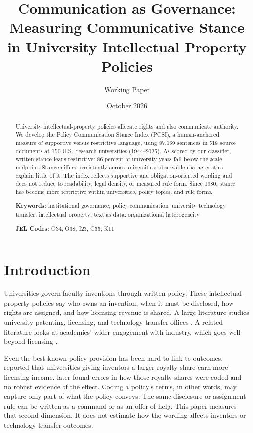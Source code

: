 \documentclass[11pt]{article}
\title{\textbf{Communication as Governance:}\\[2pt]
\textbf{Measuring Communicative Stance in University Intellectual Property Policies}}
\author{Working Paper}
\date{October 2026}
\begin{document}
\maketitle
\thispagestyle{empty}

\begin{abstract}
\noindent University intellectual-property policies allocate rights and also communicate authority. We develop the Policy Communication Stance Index (PCSI), a human-anchored measure of supportive versus restrictive language, using 87,159 sentences in 518 source documents at 150 U.S.\ research universities (1944--2025). As scored by our classifier, written stance leans restrictive: 86 percent of university-years fall below the scale midpoint. Stance differs persistently across universities; observable characteristics explain little of it. The index reflects supportive and obligation-oriented wording and does not reduce to readability, legal density, or measured rule form. Since 1980, stance has become more restrictive within universities, policy topics, and rule forms.

\vspace{0.8em}
\noindent\textbf{Keywords:} institutional governance; policy communication; university technology transfer; intellectual property; text as data; organizational heterogeneity

\noindent\textbf{JEL Codes:} O34, O38, I23, C55, K11
\end{abstract}

\newpage
\onehalfspacing

\section{Introduction}\label{sec:intro}

Universities govern faculty inventions through written policy. These intellectual-property policies say who owns an invention, when it must be disclosed, how rights are assigned, and how licensing revenue is shared. A large literature studies university patenting, licensing, and technology-transfer offices \citep{mowery2001growth,sampat2006patenting,jensen2003disclosure}. A related literature looks at academics' wider engagement with industry, which goes well beyond licensing \citep{perkmann2021academic}.

Even the best-known policy provision has been hard to link to outcomes. \citet{lach2008incentives} reported that universities giving inventors a larger royalty share earn more licensing income. \citet{ouellette2020patent} later found errors in how those royalty shares were coded and no robust evidence of the effect. Coding a policy's terms, in other words, may capture only part of what the policy conveys. The same disclosure or assignment rule can be written as a command or as an offer of help. This paper measures that second dimension. It does not estimate how the wording affects inventors or technology-transfer outcomes.
\end{document}
